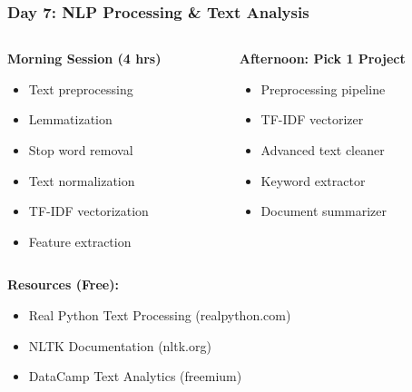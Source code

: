 \begin{frame}[fragile]\frametitle{Day 7: NLP Processing \& Text Analysis}
\begin{columns}
    \begin{column}[T]{0.5\linewidth}
      \textbf{Morning Session (4 hrs)}
      \begin{itemize}
        \item Text preprocessing
        \item Lemmatization
        \item Stop word removal
        \item Text normalization
        \item TF-IDF vectorization
        \item Feature extraction
      \end{itemize}
    \end{column}
    \begin{column}[T]{0.5\linewidth}
      \textbf{Afternoon: Pick 1 Project}
      \begin{itemize}
        \item Preprocessing pipeline
        \item TF-IDF vectorizer
        \item Advanced text cleaner
        \item Keyword extractor
        \item Document summarizer
      \end{itemize}
    \end{column}
  \end{columns}
  
  \vspace{0.3cm}
  \textbf{Resources (Free):}
  \begin{itemize}
    \item Real Python Text Processing (realpython.com)
    \item NLTK Documentation (nltk.org)
    \item DataCamp Text Analytics (freemium)
  \end{itemize}
\end{frame}

